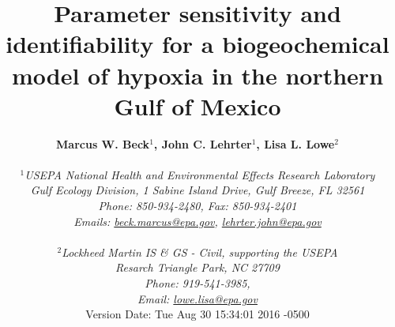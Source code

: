 \documentclass[letterpaper,12pt,oneside]{article}\usepackage[]{graphicx}\usepackage[]{color}
\begin{document}
\raggedbottom
\linenumbers
\raggedright
{}
\setlength{\parindent}{0.5in}
\renewcommand\refname{References \vspace{12pt}}

\begin{singlespace}
\title{{\bf {\Large Parameter sensitivity and identifiability for a biogeochemical model of hypoxia in the northern {G}ulf of {M}exico}}}
\author{
  {\bf {\normalsize Marcus W. Beck$^1$, John C. Lehrter$^1$, Lisa L. Lowe$^2$}}
  \\\\{\textit {\normalsize $^1$USEPA National Health and Environmental Effects Research Laboratory}}
  \\{\textit {\normalsize Gulf Ecology Division, 1 Sabine Island Drive, Gulf Breeze, FL 32561}}
	\\{\textit {\normalsize Phone: 850-934-2480, Fax: 850-934-2401}}
	\\{\textit {\normalsize Emails: \href{mailto:beck.marcus@epa.gov}{beck.marcus@epa.gov}, \href{mailto:lehrter.john@epa.gov}{lehrter.john@epa.gov}}}
	\\\\{\textit {\normalsize $^2$Lockheed Martin IS \& GS - Civil, supporting the USEPA}}
	\\{\textit {\normalsize Resarch Triangle Park, NC 27709}}
	\\{\textit {\normalsize Phone: 919-541-3985,}}
	\\{\textit {\normalsize Email: \href{mailto:lowe.lisa@epa.gov}{lowe.lisa@epa.gov}}}
  \vspace{1in} 
  \\ Version Date:   Tue Aug 30 15:34:01 2016 -0500
	}
\date{}
\maketitle
\end{singlespace}
\clearpage
\end{document}
